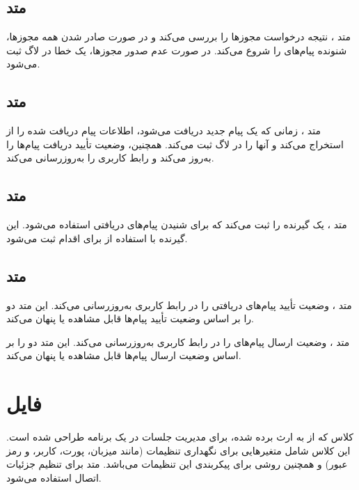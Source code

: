 \documentclass{report}
\begin{document}
\subsection{متد
}
متد
، نتیجه درخواست مجوزها را بررسی می‌کند و در صورت صادر شدن همه مجوزها، شنونده پیام‌های
 را شروع می‌کند. در صورت عدم صدور مجوزها، یک خطا در لاگ ثبت می‌شود.

\subsection{متد
}
متد 
، زمانی که یک پیام جدید دریافت می‌شود، اطلاعات پیام دریافت شده را از 
 استخراج می‌کند و آنها را در لاگ ثبت می‌کند. همچنین، وضعیت تأیید دریافت پیام‌ها را به‌روز می‌کند و رابط کاربری را به‌روزرسانی می‌کند.

\subsection{متد
}
متد
، یک گیرنده
 را ثبت می‌کند که برای شنیدن پیام‌های دریافتی
   استفاده می‌شود. این گیرنده با استفاده از 
   برای اقدام
     ثبت می‌شود.

\subsection{متد
	}
متد
، وضعیت تأیید پیام‌های دریافتی را در رابط کاربری به‌روزرسانی می‌کند. این متد دو 
را بر اساس وضعیت تأیید پیام‌ها قابل مشاهده یا پنهان می‌کند.

متد
، وضعیت ارسال پیام‌های
  را در رابط کاربری به‌روزرسانی می‌کند. این متد دو 
  را بر اساس وضعیت ارسال پیام‌ها قابل مشاهده یا پنهان می‌کند.
\section{فایل
}
کلاس 
 که از
   به ارث برده شده، برای مدیریت جلسات
     در یک برنامه
       طراحی شده است. این کلاس شامل متغیرهایی برای نگهداری تنظیمات
         (مانند میزبان، پورت، کاربر، و رمز عبور) و همچنین روشی برای پیکربندی این تنظیمات می‌باشد. متد
           برای تنظیم جزئیات اتصال
             استفاده می‌شود.
\end{document}
